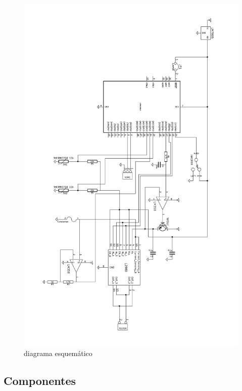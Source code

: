 \documentclass[10pt,spanish,a4paper,openany,notitlepage]{article}
\begin{document}
\begin{figure}[H] %
\begin{center}
\includegraphics[scale=0.8]{../circuitos/esquematico.pdf}
\caption{diagrama esquemático}
 \label{fig:esquematico}
\end{center}
\end{figure}

\subsection{Componentes}
\end{document}
